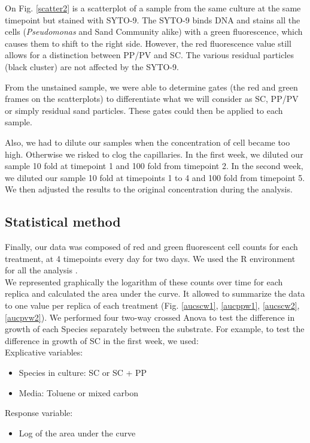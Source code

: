 \documentclass[a4paper, 10pt, conference]{ieeeconf}   %
\begin{document}
On Fig. \ref{scatter2} is a scatterplot of a sample from the same culture at the same timepoint but stained with SYTO-9. The SYTO-9 binds DNA and stains all the cells (\textit{Pseudomonas} and Sand Community alike) with a green fluorescence, which causes them to shift to the right side. However, the red fluorescence value still allows for a distinction between PP/PV and SC. The various residual particles (black cluster) are not affected by the SYTO-9. 

From the unstained sample, we were able to determine gates (the red and green frames on the scatterplots) to differentiate what we will consider as SC, PP/PV or simply residual sand particles. These gates could then be applied to each sample.

Also, we had to dilute our samples when the concentration of cell became too high. Otherwise we risked to clog the capillaries.
In the first week, we diluted our sample 10 fold at timepoint 1 and 100 fold from timepoint 2. In the second week, we diluted our sample 10 fold at timepoints 1 to 4 and 100 fold from timepoint 5.
We then adjusted the results to the original concentration during the analysis. 


\subsection{Statistical method}
Finally, our data was composed of red and green fluorescent cell counts for each treatment, at 4 timepoints every day for two days. We used the R environment for all the analysis \cite{R}.\\
We represented graphically the logarithm of these counts over time for each replica and calculated the area under the curve. It allowed to summarize the data to one value per replica of each treatment (Fig. \ref{aucscw1}, \ref{aucppw1}, \ref{aucscw2}, \ref{aucpvw2}).
We performed four two-way crossed Anova to test the difference in growth of each Species separately between the substrate. For example, to test the difference in growth of SC in the first week, we used: \\
Explicative variables:
\begin{itemize}
	\item Species in culture: SC or SC + PP
	\item Media: Toluene or mixed carbon
\end{itemize}
Response variable:
\begin{itemize}
	\item Log of the area under the curve
\end{itemize}
\end{document}
